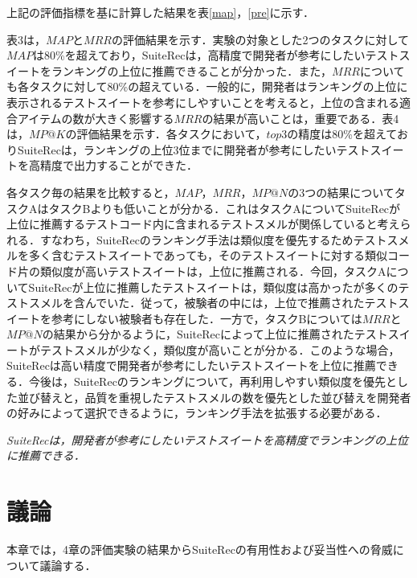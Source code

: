 \documentclass[12pt]{jarticle} %
\begin{document}
上記の評価指標を基に計算した結果を表\ref{map}，\ref{pre}に示す．

表3は，$MAP$と$MRR$の評価結果を示す．実験の対象とした2つのタスクに対して$MAP$は80\%を超えており，{\sf SuiteRec}は，高精度で開発者が参考にしたいテストスイートをランキングの上位に推薦できることが分かった．また，$MRR$についても各タスクに対して80\%の超えている．一般的に，開発者はランキングの上位に表示されるテストスイートを参考にしやすいことを考えると，上位の含まれる適合アイテムの数が大きく影響する$MRR$の結果が高いことは，重要である．表4は，$MP@K$の評価結果を示す．各タスクにおいて，$top3$の精度は$80$\%を超えており{\sf SuiteRec}は，ランキングの上位$3$位までに開発者が参考にしたいテストスイートを高精度で出力することができた．

各タスク毎の結果を比較すると，$MAP$，$MRR$，$MP@N$の3つの結果についてタスクAはタスクBよりも低いことが分かる．これはタスクAについて{\sf SuiteRec}が上位に推薦するテストコード内に含まれるテストスメルが関係していると考えられる．すなわち，{\sf SuiteRec}のランキング手法は類似度を優先するためテストスメルを多く含むテストスイートであっても，そのテストスイートに対する類似コード片の類似度が高いテストスイートは，上位に推薦される．今回，タスクAについて{\sf SuiteRec}が上位に推薦したテストスイートは，類似度は高かったが多くのテストスメルを含んでいた．従って，被験者の中には，上位で推薦されたテストスイートを参考にしない被験者も存在した．一方で，タスクBについては$MRR$と$MP@N$の結果から分かるように，{\sf SuiteRec}によって上位に推薦されたテストスイートがテストスメルが少なく，類似度が高いことが分かる．このような場合，{\sf SuiteRec}は高い精度で開発者が参考にしたいテストスイートを上位に推薦できる．今後は，{\sf SuiteRec}のランキングについて，再利用しやすい類似度を優先とした並び替えと，品質を重視したテストスメルの数を優先とした並び替えを開発者の好みによって選択できるように，ランキング手法を拡張する必要がある．

\vspace{\baselineskip}

\begin{breakbox}
\textit{{\sf SuiteRec}は，開発者が参考にしたいテストスイートを高精度でランキングの上位に推薦できる．}
\end{breakbox}


\newpage
\section{議論}

本章では，4章の評価実験の結果から{\sf SuiteRec}の有用性および妥当性への脅威について議論する．
\end{document}
